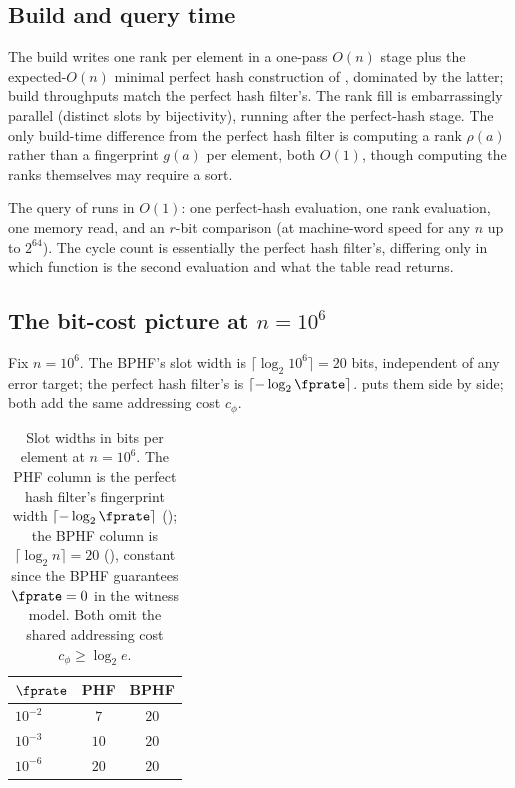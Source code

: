 \subsection*{Build and query time}

The build writes one rank per element in a one-pass $O(n)$ stage plus the
expected-$O(n)$ minimal perfect hash construction of
, dominated by the latter; build throughputs
match the perfect hash filter's. The rank fill is embarrassingly parallel
(distinct slots by bijectivity), running after the perfect-hash stage.
The only build-time difference from the perfect hash filter is computing
a rank $\rho(a)$ rather than a fingerprint $g(a)$ per element, both
$O(1)$, though computing the ranks themselves may require a sort.

The query of  runs in $O(1)$: one
perfect-hash evaluation, one rank evaluation, one memory read, and an
$r$-bit comparison (at machine-word speed for any $n$ up to $2^{64}$).
The cycle count is essentially the perfect hash filter's, differing
only in which function is the second evaluation and what the table read
returns.

\subsection*{The bit-cost picture at \texorpdfstring{$n = 10^6$}{n = 10\^{}6}}

Fix $n = 10^6$. The BPHF's slot width is $\lceil \log_2 10^6 \rceil = 20$
bits, independent of any error target; the perfect hash filter's is
$\lceil -\log_2 \fprate \rceil$.  puts them side
by side; both add the same addressing cost $c_\phi$.

\begin{table}[h]
\centering
\caption{Slot widths in bits per element at $n = 10^6$. The PHF column
is the perfect hash filter's fingerprint width $\lceil -\log_2 \fprate
\rceil$ (); the BPHF column is $\lceil \log_2 n
\rceil = 20$ (), constant since the BPHF guarantees
$\fprate = 0$ in the witness model. Both omit the shared addressing cost
$c_\phi \ge \log_2 e$.}
\label{tab:bhf-bphf-bits}
\begin{tabular}{l|cc}
\hline
  $\fprate$  & PHF & BPHF \\
\hline
  $10^{-2}$  & $7$  & $20$ \\
  $10^{-3}$  & $10$ & $20$ \\
  $10^{-6}$  & $20$ & $20$ \\
\hline
\end{tabular}
\end{table}

